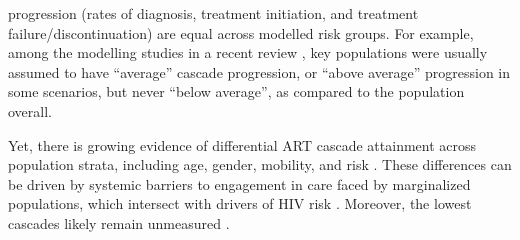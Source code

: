 progression (\ie rates of diagnosis, treatment initiation, and treatment failure/discontinuation)
are equal across modelled risk groups.
For example, among the modelling studies in a recent review \cite{Knight2022sr},
key populations were usually assumed to have ``average'' cascade progression,
or ``above average'' progression in some scenarios, but never ``below average'',
as compared to the population overall.
\par
Yet, there is growing evidence of differential ART cascade attainment across population strata,
including age, gender, mobility, and risk \cite{Hakim2018,Green2020}.
These differences can be driven by
systemic barriers to engagement in care faced by marginalized populations,
which intersect with drivers of HIV risk \cite{Wanyenze2016,Schwartz2017,Schmidt-Sane2022}.
Moreover, the lowest cascades likely remain unmeasured \cite{Hakim2018,Boothe2021}. 
